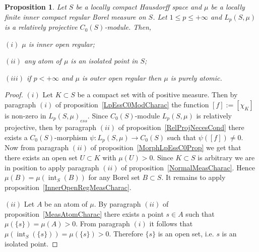 \documentclass[12pt]{article}
\newtheorem{proposition}[theorem]{Proposition}
\begin{document}
\begin{proposition}\label{LpC0ModNecessCond} Let $S$ be a locally compact
    Hausdorff space and $\mu$ be a locally finite inner compact regular Borel
    measure on $S$. Let $1\leq p\leq +\infty$ and $L_p(S,\mu)$ is a relatively
    projective $C_0(S)$-module. Then,

    $(i)$ $\mu$ is inner open regular;

    $(ii)$ any atom of $\mu$ is an isolated point in $S$;

    $(iii)$ if $p<+\infty$ and $\mu$ is outer open regular then $\mu$ is purely
    atomic.
\end{proposition}
\begin{proof} $(i)$ Let $K\subset S$ be a compact set with of positive measure.
    Then by paragraph $(i)$ of proposition~\ref{LpEssC0ModCharac} the function
    $[f]:=[\chi_K]$ is non-zero in ${L_p(S,\mu)}_{ess}$. Since $C_0(S)$-module
    $L_p(S,\mu)$ is relatively projective, then by paragraph $(ii)$ of
    proposition~\ref{RelProjNecesCond} there exists a $C_0(S)$-morphism
    $\psi:L_p(S,\mu)\to C_0(S)$ such that $\psi([f])\neq 0$. Now from paragraph
    $(ii)$ of proposition~\ref{MorphLpEssC0Prop} we get that there exists an
    open set $U\subset K$ with $\mu(U)>0$. Since $K\subset S$ is arbitrary we
    are in position to apply paragraph $(ii)$ of
    proposition~\ref{NormalMeasCharac}. Hence
    $\mu(B)=\mu(\operatorname{int}_S(B))$ for any Borel set $B\subset S$. It
    remains to apply proposition~\ref{InnerOpenRegMeasCharac}.

    $(ii)$ Let $A$ be an atom of $\mu$. By paragraph $(ii)$ of
    proposition~\ref{MeasAtomCharac} there exists a point $s\in A$ such that
    $\mu(\{s\})=\mu(A)>0$. From paragraph $(i)$ it follows that
    $\mu(\operatorname{int}_S(\{s\}))=\mu(\{s\})>0$. Therefore $\{s\}$ is an
    open set, i.e. $s$ is an isolated point.


\end{proof}
\end{document}
